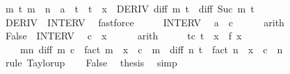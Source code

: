 \begin{isabellebody}
\ {\isachardoublequoteopen}{\isasymforall}m\ t{\isachardot}{\kern0pt}\ m\ {\isacharless}{\kern0pt}\ n\ {\isasymand}\ a\ {\isasymle}\ t\ {\isasymand}\ t\ {\isasymle}\ x\ {\isasymlongrightarrow}\ DERIV\ {\isacharparenleft}{\kern0pt}diff\ m{\isacharparenright}{\kern0pt}\ t\ {\isacharcolon}{\kern0pt}{\isachargreater}{\kern0pt}\ diff\ {\isacharparenleft}{\kern0pt}Suc\ m{\isacharparenright}{\kern0pt}\ t{\isachardoublequoteclose}\isanewline
\ \ \ \ \isamarkupfalse%
\ DERIV\ \ INTERV\ \isamarkupfalse%
\ fastforce\isanewline
\ \ \isamarkupfalse%
\ \isamarkupfalse%
\ INTERV\ \isamarkupfalse%
\ {\isachardoublequoteopen}a\ {\isasymle}\ c{\isachardoublequoteclose}\isanewline
\ \ \ \ \isamarkupfalse%
\ arith\isanewline
\ \ \isamarkupfalse%
\ \isamarkupfalse%
\ False\ \ INTERV\ \isamarkupfalse%
\ {\isachardoublequoteopen}c\ {\isacharless}{\kern0pt}\ x{\isachardoublequoteclose}\isanewline
\ \ \ \ \isamarkupfalse%
\ arith\isanewline
\ \ \isamarkupfalse%
\ \isamarkupfalse%
\ {\isachardoublequoteopen}{\isasymexists}t{\isachargreater}{\kern0pt}c{\isachardot}{\kern0pt}\ t\ {\isacharless}{\kern0pt}\ x\ {\isasymand}\ f\ x\ {\isacharequal}{\kern0pt}\isanewline
\ \ \ \ {\isacharparenleft}{\kern0pt}{\isasymSum}m{\isacharless}{\kern0pt}n{\isachardot}{\kern0pt}\ diff\ m\ c\ {\isacharslash}{\kern0pt}\ {\isacharparenleft}{\kern0pt}fact\ m{\isacharparenright}{\kern0pt}\ {\isacharasterisk}{\kern0pt}\ {\isacharparenleft}{\kern0pt}x\ {\isacharminus}{\kern0pt}\ c{\isacharparenright}{\kern0pt}\ {\isacharcircum}{\kern0pt}\ m{\isacharparenright}{\kern0pt}\ {\isacharplus}{\kern0pt}\ diff\ n\ t\ {\isacharslash}{\kern0pt}\ {\isacharparenleft}{\kern0pt}fact\ n{\isacharparenright}{\kern0pt}\ {\isacharasterisk}{\kern0pt}\ {\isacharparenleft}{\kern0pt}x\ {\isacharminus}{\kern0pt}\ c{\isacharparenright}{\kern0pt}\ {\isacharcircum}{\kern0pt}\ n{\isachardoublequoteclose}\isanewline
\ \ \ \ \isamarkupfalse%
\ {\isacharparenleft}{\kern0pt}rule\ Taylor{\isacharunderscore}{\kern0pt}up{\isacharparenright}{\kern0pt}\isanewline
\ \ \isamarkupfalse%
\ False\ \isamarkupfalse%
\ {\isacharquery}{\kern0pt}thesis\ \isamarkupfalse%
\ simp\isanewline
{}\isamarkupfalse%
%
\endisatagproof
{\isafoldproof}%
%
\isadelimproof
\isanewline
%
\endisadelimproof
%
\isadelimtheory
\isanewline
%
\endisadelimtheory
%
\isatagtheory
{}\isamarkupfalse%
%
\endisatagtheory
{\isafoldtheory}%
%
\isadelimtheory
%
\endisadelimtheory
%
\end{isabellebody}%
